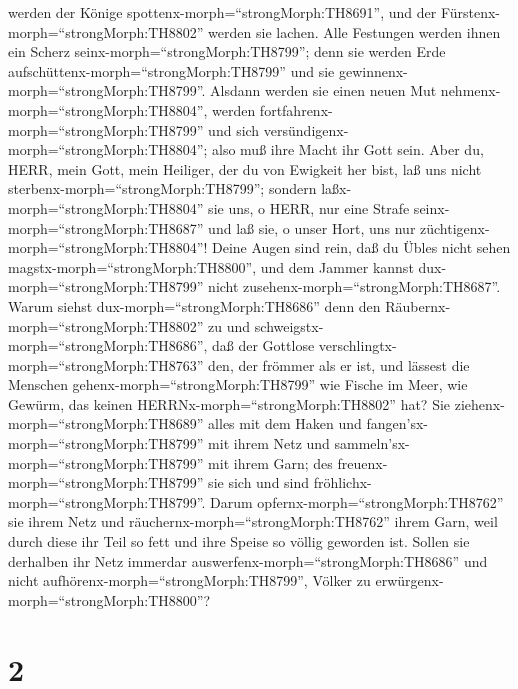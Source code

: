 werden der Könige spottenx-morph=``strongMorph:TH8691'', und der
Fürstenx-morph=``strongMorph:TH8802'' werden sie lachen. Alle Festungen
werden ihnen ein Scherz seinx-morph=``strongMorph:TH8799''; denn sie
werden Erde aufschüttenx-morph=``strongMorph:TH8799'' und sie
gewinnenx-morph=``strongMorph:TH8799''.  Alsdann werden sie
einen neuen Mut nehmenx-morph=``strongMorph:TH8804'', werden
fortfahrenx-morph=``strongMorph:TH8799'' und sich
versündigenx-morph=``strongMorph:TH8804''; also muß ihre Macht ihr Gott
sein.  Aber du, HERR, mein Gott, mein Heiliger, der du von
Ewigkeit her bist, laß uns nicht sterbenx-morph=``strongMorph:TH8799'';
sondern laßx-morph=``strongMorph:TH8804'' sie uns, o HERR, nur eine
Strafe seinx-morph=``strongMorph:TH8687'' und laß sie, o unser Hort, uns
nur züchtigenx-morph=``strongMorph:TH8804''!  Deine Augen
sind rein, daß du Übles nicht sehen magstx-morph=``strongMorph:TH8800'',
und dem Jammer kannst dux-morph=``strongMorph:TH8799'' nicht
zusehenx-morph=``strongMorph:TH8687''. Warum siehst
dux-morph=``strongMorph:TH8686'' denn den
Räubernx-morph=``strongMorph:TH8802'' zu und
schweigstx-morph=``strongMorph:TH8686'', daß der Gottlose
verschlingtx-morph=``strongMorph:TH8763'' den, der frömmer als er ist,
 und lässest die Menschen
gehenx-morph=``strongMorph:TH8799'' wie Fische im Meer, wie Gewürm, das
keinen HERRNx-morph=``strongMorph:TH8802'' hat?  Sie
ziehenx-morph=``strongMorph:TH8689'' alles mit dem Haken und
fangen'sx-morph=``strongMorph:TH8799'' mit ihrem Netz und
sammeln'sx-morph=``strongMorph:TH8799'' mit ihrem Garn; des
freuenx-morph=``strongMorph:TH8799'' sie sich und sind
fröhlichx-morph=``strongMorph:TH8799''.  Darum
opfernx-morph=``strongMorph:TH8762'' sie ihrem Netz und
räuchernx-morph=``strongMorph:TH8762'' ihrem Garn, weil durch diese ihr
Teil so fett und ihre Speise so völlig geworden ist. 
Sollen sie derhalben ihr Netz immerdar
auswerfenx-morph=``strongMorph:TH8686'' und nicht
aufhörenx-morph=``strongMorph:TH8799'', Völker zu
erwürgenx-morph=``strongMorph:TH8800''?

\hypertarget{section-1}{%
\section{2}\label{section-1}}

